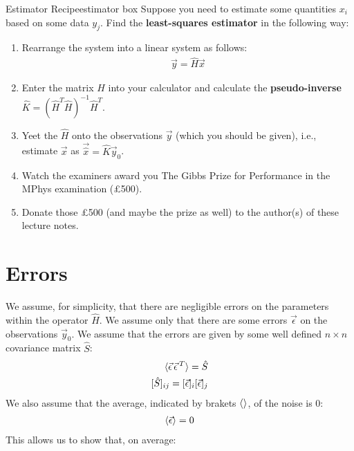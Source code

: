 \begin{fact}{Estimator Recipe}{estimator box}\label{estimator box}
    Suppose you need to estimate some quantities $x_i$ based on some data $y_j$. Find the \textbf{least-squares estimator} in the following way:
    \begin{enumerate}
        \item Rearrange the system into a linear system as follows:
    \begin{align*}
        \vec{y}=\hat{H}\vec{x}
    \end{align*}
        \item Enter the matrix $\hat{H}$ into your calculator and calculate the \textbf{pseudo-inverse} $\hat{K}= (\hat{H}^T\hat{H})^{-1}\hat{H}^T$. 
        \item Yeet the $\hat{H}$ onto the observations $\vec{y}$ (which you should be given), i.e., estimate $\vec{x}$ as $\vec{\hat{x}}=\hat{K}\vec{y}_0$.
        \item Watch the examiners award you The Gibbs Prize for Performance in the MPhys examination (£500).
        \item Donate those £500 (and maybe the prize as well) to the author(s) of these lecture notes.
    \end{enumerate}
\end{fact}

\section{Errors}

We assume, for simplicity, that there are negligible errors on the parameters within the operator $\hat{H}$. We assume only that there are some errors $\vec{\epsilon}$ on the observations $\vec{y}_0$. We assume that the errors are given by some well defined $n\times n$ covariance matrix $\hat{S}$:
\begin{align*}
    \braket{\vec{\epsilon}\,\vec{\epsilon}\,^T}=\hat{S}\\
    [\hat{S}]_{ij}=[\vec{\epsilon}]_i[\vec{\epsilon}]_j
\end{align*}
We also assume that the average, indicated by brakets $\braket{}$, of the noise is $0$:
\begin{align*}
    \braket{\vec{\epsilon}}=0
\end{align*}
This allows us to show that, on average:

